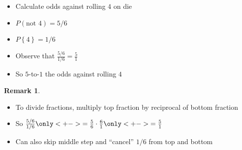 \documentclass[handout]{beamer}
\theoremstyle{definition}
\newtheorem{remark}{Remark}
\begin{document}
\begin{frame}
\begin{example}
\begin{itemize}
\item Calculate odds against rolling $4$ on die
\item $P\left(\text{not $4$}\right)=5/6$
\item $P\left\{4\right\}=1/6$
\item Observe that $\frac{5/6}{1/6}=\frac{5}{1}$
\item So $5$-to-$1$ the odds against rolling $4$
\end{itemize}
\end{example}
\begin{remark}
\begin{itemize}
\item To divide fractions, multiply top fraction
by \alert{reciprocal} of bottom fraction
\item So
$\frac{5/6}{1/6}
\only<+->{=\frac{5}{6}\cdot\frac{6}{1}}\only<+->{=\frac{5}{1}}$
\item Can also skip middle step and ``cancel'' $1/6$ from
top and bottom
\end{itemize}
\end{remark}
\end{frame}
\end{document}
